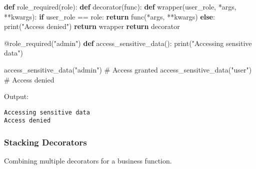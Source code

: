 \documentclass[
  letterpaper,
  DIV=11,
  numbers=noendperiod]{scrreprt}
\newenvironment{Shaded}{\begin{snugshade}}{\end{snugshade}}
\newcommand{\AttributeTok}[1]{\textcolor[rgb]{0.40,0.45,0.13}{#1}}
\newcommand{\BuiltInTok}[1]{\textcolor[rgb]{0.00,0.23,0.31}{#1}}
\newcommand{\CommentTok}[1]{\textcolor[rgb]{0.37,0.37,0.37}{#1}}
\newcommand{\ControlFlowTok}[1]{\textcolor[rgb]{0.00,0.23,0.31}{\textbf{#1}}}
\newcommand{\KeywordTok}[1]{\textcolor[rgb]{0.00,0.23,0.31}{\textbf{#1}}}
\newcommand{\NormalTok}[1]{\textcolor[rgb]{0.00,0.23,0.31}{#1}}
\newcommand{\OperatorTok}[1]{\textcolor[rgb]{0.37,0.37,0.37}{#1}}
\newcommand{\StringTok}[1]{\textcolor[rgb]{0.13,0.47,0.30}{#1}}
\begin{document}
\begin{Shaded}
\begin{Highlighting}[]
\KeywordTok{def}\NormalTok{ role\_required(role):}
    \KeywordTok{def}\NormalTok{ decorator(func):}
        \KeywordTok{def}\NormalTok{ wrapper(user\_role, }\OperatorTok{*}\NormalTok{args, }\OperatorTok{**}\NormalTok{kwargs):}
            \ControlFlowTok{if}\NormalTok{ user\_role }\OperatorTok{==}\NormalTok{ role:}
                \ControlFlowTok{return}\NormalTok{ func(}\OperatorTok{*}\NormalTok{args, }\OperatorTok{**}\NormalTok{kwargs)}
            \ControlFlowTok{else}\NormalTok{:}
                \BuiltInTok{print}\NormalTok{(}\StringTok{"Access denied"}\NormalTok{)}
        \ControlFlowTok{return}\NormalTok{ wrapper}
    \ControlFlowTok{return}\NormalTok{ decorator}

\AttributeTok{@role\_required}\NormalTok{(}\StringTok{"admin"}\NormalTok{)}
\KeywordTok{def}\NormalTok{ access\_sensitive\_data():}
    \BuiltInTok{print}\NormalTok{(}\StringTok{"Accessing sensitive data"}\NormalTok{)}

\NormalTok{access\_sensitive\_data(}\StringTok{"admin"}\NormalTok{)  }\CommentTok{\# Access granted}
\NormalTok{access\_sensitive\_data(}\StringTok{"user"}\NormalTok{)   }\CommentTok{\# Access denied}
\end{Highlighting}
\end{Shaded}

Output:

\begin{verbatim}
Accessing sensitive data
Access denied
\end{verbatim}

\subsubsection{Stacking Decorators}\label{stacking-decorators}

Combining multiple decorators for a business function.
\end{document}
